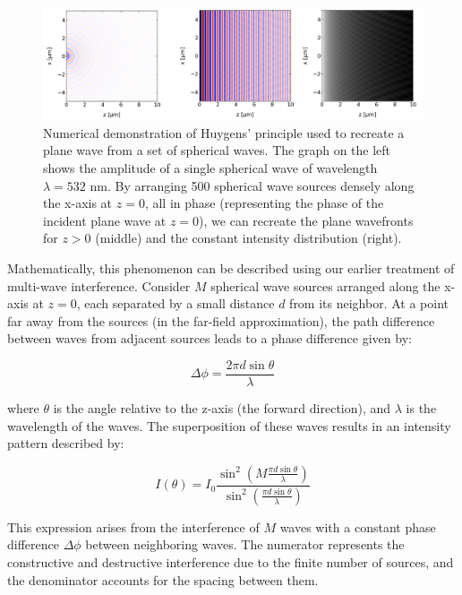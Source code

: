\documentclass[
  a4paper,
]{book}
\begin{document}
\begin{figure}[H]

{\centering \includegraphics[width=1\linewidth,height=\textheight,keepaspectratio]{wave-optics/img/huygens_num.png}

}

\caption{Numerical demonstration of Huygens' principle used to recreate
a plane wave from a set of spherical waves. The graph on the left shows
the amplitude of a single spherical wave of wavelength \(\lambda=532\)
nm. By arranging 500 spherical wave sources densely along the x-axis at
\(z=0\), all in phase (representing the phase of the incident plane wave
at \(z=0\)), we can recreate the plane wavefronts for \(z>0\) (middle)
and the constant intensity distribution (right).}

\end{figure}%

Mathematically, this phenomenon can be described using our earlier
treatment of multi-wave interference. Consider \(M\) spherical wave
sources arranged along the x-axis at \(z=0\), each separated by a small
distance \(d\) from its neighbor. At a point far away from the sources
(in the far-field approximation), the path difference between waves from
adjacent sources leads to a phase difference given by:

\[
\Delta \phi = \frac{2\pi d \sin \theta }{\lambda}
\]

where \(\theta\) is the angle relative to the z-axis (the forward
direction), and \(\lambda\) is the wavelength of the waves. The
superposition of these waves results in an intensity pattern described
by:

\[
I(\theta) = I_0 \frac{\sin^2\left ( M \frac{\pi d \sin \theta }{\lambda} \right )}{\sin^2\left ( \frac{\pi d \sin \theta }{\lambda} \right )}
\]

This expression arises from the interference of \(M\) waves with a
constant phase difference \(\Delta \phi\) between neighboring waves. The
numerator represents the constructive and destructive interference due
to the finite number of sources, and the denominator accounts for the
spacing between them.
\end{document}
